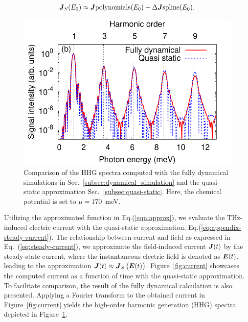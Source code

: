 \begin{align}
\boldsymbol J_S(E_0)\approx \boldsymbol{J}{\mathrm{polynomials }}(E_0)+\Delta \boldsymbol{J}{\mathrm{spline}}(E_0).
\label{eqn:approx}
\end{align}

\begin{figure}[htb]
    \centering
\includegraphics[width=0.8\linewidth]{pic/hhg_qstatic.pdf}
\caption{\label{fig:hhg_qstatic} 
Comparison of the HHG spectra computed with the fully dynamical simulations in Sec.~\ref{subsec:dynamical_simulation} and the quasi-static approximation Sec.~\ref{subsec:quasi-static}. Here, the chemical potential is set to $\mu =170$~meV.}
\end{figure}

Utilizing the approximated function in Eq.(\ref{eqn:approx}), we evaluate the THz-induced electric
current with the quasi-static approximation, Eq.(\ref{eq:appendix-steady-current}).
The relationship between current and field as expressed in Eq.~(\ref{eq:steady-current}), we approximate the field-induced current $\boldsymbol J(t)$ by the steady-state current, where the instantaneous electric field is denoted as $\boldsymbol E(t)$, leading to the approximation $\boldsymbol J(t)\approx \boldsymbol J_S\left( \boldsymbol E(t) \right)$.
Figure~\ref{fig:current} showcases the computed current as a function of time with the quasi-static
approximation. To facilitate comparison, the result of the fully dynamical calculation is also
presented. Applying a Fourier transform to the obtained current in Figure~\ref{fig:current} yields
the high-order harmonic generation (HHG) spectra depicted in Figure~\ref{fig:hhg_qstatic}.

